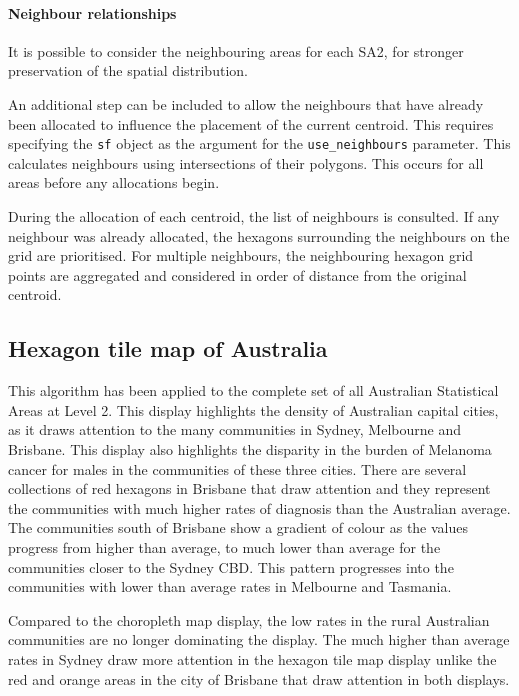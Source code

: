 \hypertarget{neighbour-relationships}{%
\paragraph{Neighbour relationships}\label{neighbour-relationships}}

It is possible to consider the neighbouring areas for each SA2, for
stronger preservation of the spatial distribution.

An additional step can be included to allow the neighbours that have
already been allocated to influence the placement of the current
centroid. This requires specifying the \texttt{sf} object as the
argument for the \texttt{use\_neighbours} parameter. This calculates
neighbours using intersections of their polygons. This occurs for all
areas before any allocations begin.

During the allocation of each centroid, the list of neighbours is
consulted. If any neighbour was already allocated, the hexagons
surrounding the neighbours on the grid are prioritised. For multiple
neighbours, the neighbouring hexagon grid points are aggregated and
considered in order of distance from the original centroid.

\hypertarget{hexagon-tile-map-of-australia}{%
\subsection{Hexagon tile map of
Australia}\label{hexagon-tile-map-of-australia}}

This algorithm has been applied to the complete set of all Australian
Statistical Areas at Level 2. This display highlights the density of
Australian capital cities, as it draws attention to the many communities
in Sydney, Melbourne and Brisbane. This display also highlights the
disparity in the burden of Melanoma cancer for males in the communities
of these three cities. There are several collections of red hexagons in
Brisbane that draw attention and they represent the communities with
much higher rates of diagnosis than the Australian average. The
communities south of Brisbane show a gradient of colour as the values
progress from higher than average, to much lower than average for the
communities closer to the Sydney CBD. This pattern progresses into the
communities with lower than average rates in Melbourne and Tasmania.

Compared to the choropleth map display, the low rates in the rural
Australian communities are no longer dominating the display. The much
higher than average rates in Sydney draw more attention in the hexagon
tile map display unlike the red and orange areas in the city of Brisbane
that draw attention in both displays.

